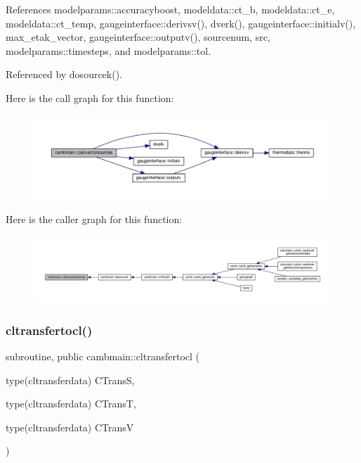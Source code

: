 References modelparams\+::accuracyboost, modeldata\+::ct\+\_\+b, modeldata\+::ct\+\_\+e, modeldata\+::ct\+\_\+temp, gaugeinterface\+::derivsv(), dverk(), gaugeinterface\+::initialv(), max\+\_\+etak\+\_\+vector, gaugeinterface\+::outputv(), sourcenum, src, modelparams\+::timesteps, and modelparams\+::tol.



Referenced by dosourcek().

Here is the call graph for this function\+:
\nopagebreak
\begin{figure}[H]
\begin{center}
\leavevmode
\includegraphics[width=350pt]{namespacecambmain_affd6aea4c80363ff01132e154eabbb00_cgraph}
\end{center}
\end{figure}
Here is the caller graph for this function\+:
\nopagebreak
\begin{figure}[H]
\begin{center}
\leavevmode
\includegraphics[width=350pt]{namespacecambmain_affd6aea4c80363ff01132e154eabbb00_icgraph}
\end{center}
\end{figure}
\mbox{\label{namespacecambmain_a15c0f01f07762c709f8f718935153d7a}} 
\subsubsection{\texorpdfstring{cltransfertocl()}{cltransfertocl()}}
{\footnotesize\ttfamily subroutine, public cambmain\+::cltransfertocl (\begin{DoxyParamCaption}\item[{type(cltransferdata)}]{C\+TransS,  }\item[{type(cltransferdata)}]{C\+TransT,  }\item[{type(cltransferdata)}]{C\+TransV }\end{DoxyParamCaption})}




